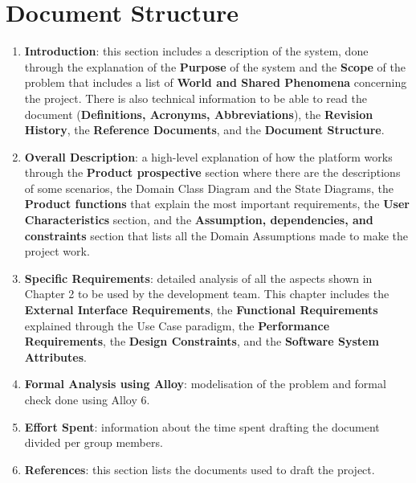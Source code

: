 \section{Document Structure}
\begin{enumerate}
    \item \textbf{Introduction}: this section includes a description of the system, done through the explanation of the \textbf{Purpose} of the system and the \textbf{Scope} of the problem that includes a list of \textbf{World and Shared Phenomena} concerning the project. There is also technical information to be able to read the document (\textbf{Definitions, Acronyms, Abbreviations}), the \textbf{Revision History}, the \textbf{Reference Documents}, and the \textbf{Document Structure}.
    \item \textbf{Overall Description}: a high-level explanation of how the platform works through the \textbf{Product prospective} section where there are the descriptions of some scenarios, the Domain Class Diagram and the State Diagrams, the \textbf{Product functions} that explain the most important requirements, the \textbf{User Characteristics} section, and the \textbf{Assumption, dependencies, and constraints} section that lists all the Domain Assumptions made to make the project work.
    \item \textbf{Specific Requirements}: detailed analysis of all the aspects shown in Chapter 2 to be used by the development team. This chapter includes the \textbf{External Interface Requirements}, the \textbf{Functional Requirements} explained through the Use Case paradigm, the \textbf{Performance Requirements}, the \textbf{Design Constraints}, and the \textbf{Software System Attributes}.
    \item \textbf{Formal Analysis using Alloy}: modelisation of the problem and formal check done using Alloy 6.
    \item \textbf{Effort Spent}: information about the time spent drafting the document divided per group members.
    \item \textbf{References}: this section lists the documents used to draft the project.
\end{enumerate}